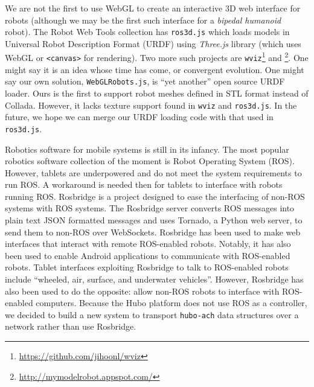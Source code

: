 \documentclass[letterpaper, 10 pt, conference]{ieee/ieeeconf}  %
\begin{document}
We are not the first to use WebGL to create an interactive 3D web interface for robots (although we may be the first such interface for a \textit{bipedal humanoid} robot).
The Robot Web Tools collection has \texttt{ros3d.js} which loads models in Universal Robot Description Format (URDF) using \textit{Three.js} library (which uses WebGL or \texttt{<canvas>} for rendering). \cite{alexander2012robot}
Two more such projects are \texttt{wviz}\footnote{\url{https://github.com/jihoonl/wviz}} and \footnote{\url{http://mymodelrobot.appspot.com/}}.
One might say it is an idea whose time has come, or convergent evolution.
One might say our own solution, \texttt{WebGLRobots.js}, is ``yet another'' open source URDF loader.
Ours is the first to support robot meshes defined in STL format instead of Collada.
However, it lacks texture support found in \texttt{wviz} and \texttt{ros3d.js}.
In the future, we hope we can merge our URDF loading code with that used in \texttt{ros3d.js}.

Robotics software for mobile systems is still in its infancy.
The most popular robotics software collection of the moment is Robot Operating System (ROS). \cite{quigley2009ros}
However, tablets are underpowered and do not meet the system requirements to run ROS.
A workaround is needed then for tablets to interface with robots running ROS.
Rosbridge is a project designed to ease the interfacing of non-ROS systems with ROS systems. \cite{crick2011rosbridge}
The Rosbridge server converts ROS messages into plain text JSON formatted messages and uses Tornado, a Python web server, to send them to non-ROS over WebSockets.
Rosbridge has been used to make web interfaces that interact with remote ROS-enabled robots. \cite{pitzer2012pr2}
Notably, it has also been used to enable Android applications to communicate with ROS-enabled robots.
Tablet interfaces exploiting Rosbridge to talk to ROS-enabled robots include ``wheeled, air, surface, and underwater vehicles''.  \cite{speers2013diver}
However, Rosbridge has also been used to do the opposite: allow non-ROS robots to interface with ROS-enabled computers. \cite{dallaroslink} \cite{aznar2014ros}
Because the Hubo platform does not use ROS as a controller, we decided to build a new system to transport \texttt{hubo-ach} data structures over a network rather than use Rosbridge.

 \cite{brownapplications} \cite{leeweb} \cite{crick2012ros} \cite{lofaro2012humanoid} 
\end{document}

